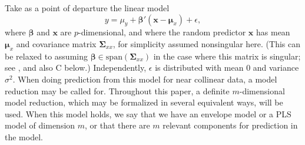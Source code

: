 \documentclass[num-refs]{wiley-article}
\begin{document}
Take as a point of departure the linear model
\begin{equation}
  \label{model}
  y=\mu_{y}+\bm{\beta}'(\bm{x}-\bm{\mu}_{x})+\epsilon,
\end{equation}
where $\bm{\beta}$ and $\bm{x}$ are $p$-dimensional, and where the random predictor $\bm{x}$ has mean $\bm{\mu}_{x}$ and covariance matrix $\bm{\Sigma}_{xx}$, for simplicity assumed nonsingular here. (This can be relaxed to assuming $\bm{\beta}\in\mathrm{span}(\bm{\Sigma}_{xx})$ in the case where this matrix is singular; see \citep{cook2013envelopes}, and also C below.) Independently, $\epsilon$ is distributed with mean $0$ and variance $\sigma^2$. When doing prediction from this model for near collinear data, a model reduction may be called for. Throughout this paper, a definite $m$-dimensional model reduction, which may be formalized in several equivalent ways, will be used. When this model holds, we say that we have an envelope model or a PLS model of dimension $m$, or that there are $m$ relevant components for prediction in the model. \smallskip
\end{document}
